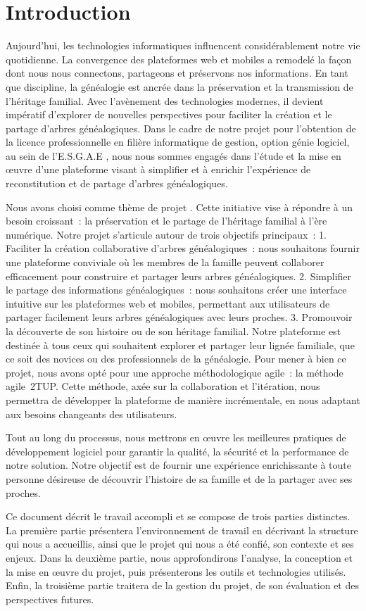 \chapter*{Introduction}
\label{chap:introduction}
Aujourd’hui, les technologies informatiques influencent considérablement notre
vie quotidienne. La convergence des plateformes web et mobiles a remodelé la
façon dont nous nous connectons, partageons et préservons nos informations.
En tant que discipline, la généalogie est ancrée dans la préservation et la
transmission de l’héritage familial. Avec l’avènement des technologies modernes,
il devient impératif d’explorer de nouvelles perspectives pour faciliter la
création et le partage d’arbres généalogiques. Dans le cadre de notre projet pour
l’obtention de la licence professionnelle en filière informatique de gestion,
option génie logiciel, au sein de l'\ac{E.S.G.A.E} , nous nous sommes engagés dans l’étude et la mise
en œuvre d’une plateforme visant à simplifier et à enrichir l’expérience de
reconstitution et de partage d’arbres généalogiques.

Nous avons choisi comme thème de projet \og{\textbf{\projettheme}}\fg. Cette initiative vise à répondre à un besoin croissant : la préservation
et le partage de l’héritage familial à l’ère numérique.
Notre projet s’articule autour de trois objectifs principaux :
1. Faciliter la création collaborative d’arbres généalogiques : nous souhaitons
fournir une plateforme conviviale où les membres de la famille peuvent collaborer
efficacement pour construire et partager leurs arbres généalogiques.
2. Simplifier le partage des informations généalogiques : nous souhaitons créer
une interface intuitive sur les plateformes web et mobiles, permettant aux utilisateurs
de partager facilement leurs arbres généalogiques avec leurs proches.
3. Promouvoir la découverte de son histoire ou de son héritage familial.
Notre plateforme est destinée à tous ceux qui souhaitent explorer et partager
leur lignée familiale, que ce soit des novices ou des professionnels de la généalogie.
Pour mener à bien ce projet, nous avons opté pour une approche méthodologique agile :
la méthode agile \ac{2TUP}.
Cette méthode, axée sur la collaboration et l’itération, nous permettra de développer
la plateforme de manière incrémentale, en nous adaptant aux besoins changeants des utilisateurs.

Tout au long du processus, nous mettrons en œuvre les meilleures pratiques de
développement logiciel pour garantir la qualité, la sécurité et la performance
de notre solution. Notre objectif est de fournir une expérience enrichissante à
toute personne désireuse de découvrir l’histoire de sa famille et de la partager avec ses proches.

Ce document décrit le travail accompli et se compose de trois parties distinctes.
La première partie présentera l’environnement de travail en décrivant la structure
qui nous a accueillis, ainsi que le projet qui nous a été confié, son contexte
et ses enjeux. Dans la deuxième partie, nous approfondirons l’analyse, la conception
et la mise en œuvre du projet, puis présenterons les outils et technologies utilisés.
Enfin, la troisième partie traitera de la gestion du projet, de son évaluation et
des perspectives futures.
